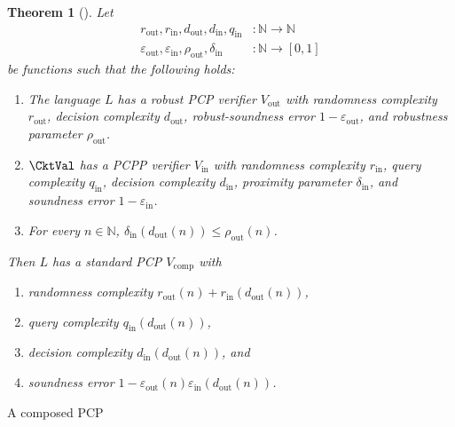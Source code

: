 \documentclass[english,12pt]{reedthesis}
\theoremstyle{plain}
\newtheorem{thm}{Theorem}[section]
\theoremstyle{definition}
\theoremstyle{remark}
\DeclareMathOperator{\comp}{comp}
\DeclareMathOperator{\out}{out}
\DeclareMathOperator{\oin}{in}
\begin{document}
\begin{thm}[{\cite[Theorem 2.7]{BGHSV06}}]\label{thm:composition}
  Let
  \begin{align*}
    r_{\out}, r_{\oin}, d_{\out}, d_{\oin}, q_{\oin}&\colon \mathbb{N} \rightarrow \mathbb{N} \\
    \varepsilon_{\out}, \varepsilon_{\oin}, \rho_{\out}, \delta_{\oin}&\colon \mathbb{N} \rightarrow [0, 1]
  \end{align*}
  be functions such that the following holds:
  \begin{enumerate}
    \item The language $L$ has a robust PCP verifier $V_{\out}$ with randomness
          complexity $r_{\out}$, decision complexity $d_{\out}$,
          robust-soundness error $1 - \varepsilon_{\out}$, and robustness parameter
          $\rho_{\out}$.
    \item $\CktVal$ has a PCPP verifier $V_{\oin}$ with randomness complexity
          $r_{\oin}$, query complexity $q_{\oin}$, decision complexity
          $d_{\oin}$, proximity parameter $\delta_{\oin}$, and soundness error
          $1 - \varepsilon_{\oin}$.
    \item For every $n \in \mathbb{N}$, $\delta_{\oin}(d_{\out}(n)) \le \rho_{\out}(n)$.
  \end{enumerate}
  Then $L$ has a standard PCP $V_{\comp}$ with
  \begin{enumerate}[label=\alph*.]
    \item randomness complexity $r_{\out}(n) + r_{\oin}(d_{\out}(n))$,
    \item query complexity $q_{\oin}(d_{\out}(n))$,
    \item decision complexity $d_{\oin}(d_{\out}(n))$, and
    \item soundness error $1 - \varepsilon_{\out}(n)\varepsilon_{\oin}(d_{\out}(n))$.
  \end{enumerate}
\end{thm}

\begin{algorithm}[htbp]
  \caption{A composed PCP~\cite[Theorem 2.7]{BGHSV06}}\label{alg:composed-pcp}
\end{algorithm}
\end{document}
